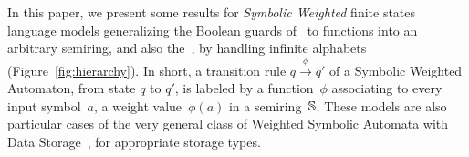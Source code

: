 In this paper, we present some results for 
\emph{Symbolic Weighted} finite states language models %
generalizing the Boolean guards of~\SA %
to functions into an arbitrary semiring, 
and also the~\WA, by handling infinite alphabets (Figure~\ref{fig:hierarchy}).
%
In short, a transition rule $q \xrightarrow{\phi} q'$ of a Symbolic Weighted Automaton, 
from state $q$ to $q'$,
is labeled by a function~$\phi$ associating to every input symbol~$a$, a weight value~$\phi(a)$
in a semiring~$\mathbb{S}$.
%
These models are also 
particular cases of the very general class of 
Weighted Symbolic Automata with Data Storage~\cite{Herrmann16dlt,Herrmann20phd}, 
for appropriate storage types.

